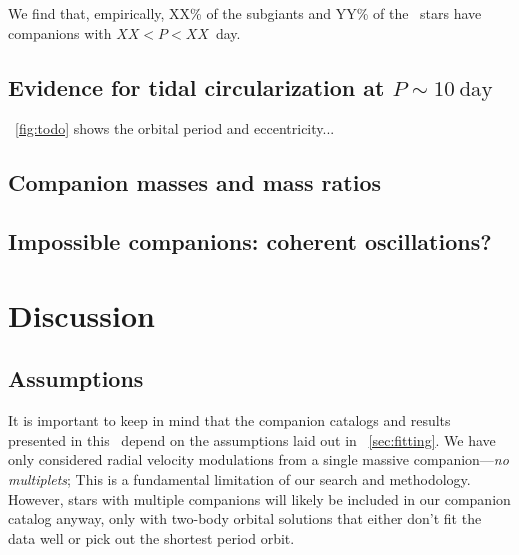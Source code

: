 \documentclass[modern, letterpaper]{aastex62}
\newcommand{\RC}{\acronym{RC}}
\begin{document}
We find that, empirically, XX\% of the subgiants and YY\% of the \RC\ stars have
companions with $XX < P < XX$~day.


\subsection{Evidence for tidal circularization at $P\sim 10~\textrm{day}$}


\figurename~\ref{fig:todo} shows the orbital period and eccentricity...



\subsection{Companion masses and mass ratios}



\subsection{Impossible companions: coherent oscillations?}



\section{Discussion}

\subsection{Assumptions}
\label{sec:discuss-assumptions}

It is important to keep in mind that the companion catalogs and results
presented in this \documentname\ depend on the assumptions laid out in
\sectionname~\ref{sec:fitting}.
We have only considered radial velocity modulations from a single massive
companion---\emph{no multiplets}; This is a fundamental limitation of our search
and methodology.
However, stars with multiple companions will likely be included in our companion
catalog anyway, only with two-body orbital solutions that either don't fit the
data well or pick out the shortest period orbit.
\end{document}
